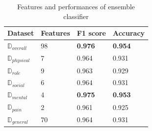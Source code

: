 \documentclass[12pt]{article}
\begin{document}
\begin{table}[ht]
\begin{tabular}{|C{3cm}|C{3cm}|C{3cm}|C{3cm}|}
\hline
{} 
{\color[HTML]{333333} \textbf{Dataset}} & {\color[HTML]{333333} \textbf{Features}} & {\color[HTML]{333333} \textbf{F1 score}} & {\color[HTML]{333333} \textbf{Accuracy}} \\ \hline
{} 
\textbf{$\mathbb{D}_{overall}$}& 98  & \textbf{0.976}  & \textbf{0.954} \\ \hline
{} 
\textbf{$\mathbb{D}_{physical}$}& 7  & 0.964  & 0.931 \\ \hline
{} 
\textbf{$\mathbb{D}_{role}$} & 9  & 0.963   & 0.929    \\ \hline
{} 
\textbf{$\mathbb{D}_{social}$} & 6   & 0.964  & 0.931 \\ \hline
{} 
\textbf{$\mathbb{D}_{mental}$ }  & 4  & \textbf{0.975}  & \textbf{0.953}  \\ \hline
{} 
\textbf{$\mathbb{D}_{pain} $ }  & 2  & 0.961  & 0.925  \\ \hline
{} 
\textbf{$\mathbb{D}_{general}$ }  & 70  & 0.964  & 0.931  \\ \hline
\end{tabular}
\caption{Features and performances of ensemble classifier}
\label{subsets}
\end{table}
\end{document}
